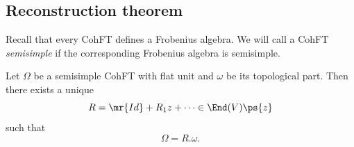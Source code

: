 \subsection{Reconstruction theorem}%
\label{sub:Reconstruction theorem}

Recall that every CohFT defines a Frobenius algebra. We will call a CohFT \textit{semisimple} if the corresponding Frobenius algebra is semisimple.

\begin{thm}%
\label{thm:teleman}
    Let $\Omega$ be a semisimple CohFT with flat unit and $\omega$ be its topological part. Then there exists a unique 
    \[ R = \mr{Id} + R_1 z + \cdots \in \End(V)\ps{z} \]
    such that
    \[ \Omega = R.\omega. \]
\end{thm}

